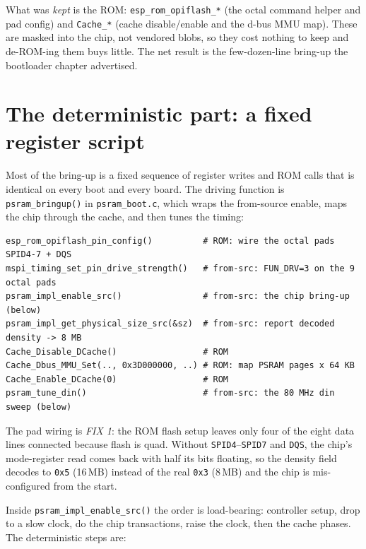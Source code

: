 What was \emph{kept} is the ROM: \texttt{esp\_rom\_opiflash\_*} (the octal command
helper and pad config) and \texttt{Cache\_*} (cache disable/enable and the d-bus MMU
map). These are masked into the chip, not vendored blobs, so they cost nothing to
keep and de-ROM-ing them buys little. The net result is the few-dozen-line bring-up
the bootloader chapter advertised.


\section{The deterministic part: a fixed register script}

Most of the bring-up is a fixed sequence of register writes and ROM calls that is
identical on every boot and every board. The driving function is
\texttt{psram\_bringup()} in \texttt{psram\_boot.c}, which wraps the from-source
enable, maps the chip through the cache, and then tunes the timing:

\begin{lstlisting}[style=sh]
esp_rom_opiflash_pin_config()          # ROM: wire the octal pads SPID4-7 + DQS
mspi_timing_set_pin_drive_strength()   # from-src: FUN_DRV=3 on the 9 octal pads
psram_impl_enable_src()                # from-src: the chip bring-up (below)
psram_impl_get_physical_size_src(&sz)  # from-src: report decoded density -> 8 MB
Cache_Disable_DCache()                 # ROM
Cache_Dbus_MMU_Set(.., 0x3D000000, ..) # ROM: map PSRAM pages x 64 KB
Cache_Enable_DCache(0)                 # ROM
psram_tune_din()                       # from-src: the 80 MHz din sweep (below)
\end{lstlisting}

The pad wiring is \emph{FIX 1}: the ROM flash setup leaves only four of the eight
data lines connected because flash is quad. Without \texttt{SPID4}--\texttt{SPID7}
and \texttt{DQS}, the chip's mode-register read comes back with half its bits
floating, so the density field decodes to \texttt{0x5} (16\,MB) instead of the real
\texttt{0x3} (8\,MB) and the chip is mis-configured from the start.

Inside \texttt{psram\_impl\_enable\_src()} the order is load-bearing: controller
setup, drop to a slow clock, do the chip transactions, raise the clock, then the
cache phases. The deterministic steps are:

